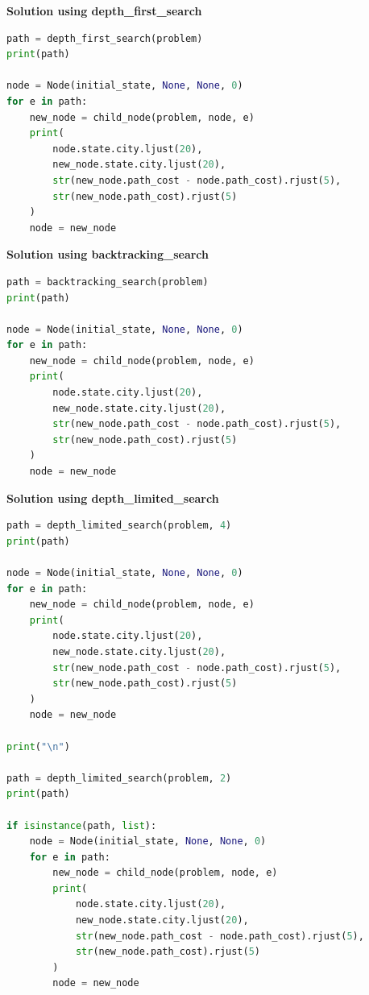 {\centering \textbf{Solution using depth\_first\_search} \par}

\begin{lstlisting}[language=Python]
path = depth_first_search(problem)
print(path)

node = Node(initial_state, None, None, 0)
for e in path:
    new_node = child_node(problem, node, e)
    print(
        node.state.city.ljust(20),
        new_node.state.city.ljust(20),
        str(new_node.path_cost - node.path_cost).rjust(5),
        str(new_node.path_cost).rjust(5)
    )
    node = new_node
\end{lstlisting}


{\centering \textbf{Solution using backtracking\_search} \par}

\begin{lstlisting}[language=Python]
path = backtracking_search(problem)
print(path)

node = Node(initial_state, None, None, 0)
for e in path:
    new_node = child_node(problem, node, e)
    print(
        node.state.city.ljust(20),
        new_node.state.city.ljust(20),
        str(new_node.path_cost - node.path_cost).rjust(5),
        str(new_node.path_cost).rjust(5)
    )
    node = new_node
\end{lstlisting}



{\centering \textbf{Solution using depth\_limited\_search} \par}

\begin{lstlisting}[language=Python]
path = depth_limited_search(problem, 4)
print(path)

node = Node(initial_state, None, None, 0)
for e in path:
    new_node = child_node(problem, node, e)
    print(
        node.state.city.ljust(20),
        new_node.state.city.ljust(20),
        str(new_node.path_cost - node.path_cost).rjust(5),
        str(new_node.path_cost).rjust(5)
    )
    node = new_node

print("\n")

path = depth_limited_search(problem, 2)
print(path)

if isinstance(path, list):
    node = Node(initial_state, None, None, 0)
    for e in path:
        new_node = child_node(problem, node, e)
        print(
            node.state.city.ljust(20),
            new_node.state.city.ljust(20),
            str(new_node.path_cost - node.path_cost).rjust(5),
            str(new_node.path_cost).rjust(5)
        )
        node = new_node
\end{lstlisting}


